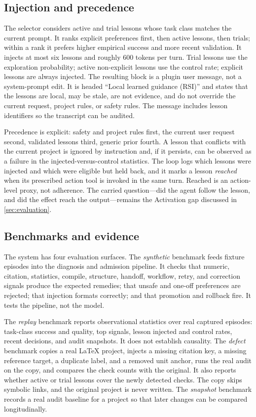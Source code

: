 \subsection{Injection and precedence}
\label{sec:injection}
The selector considers active and trial lessons whose task class matches the current prompt. It ranks explicit preferences first, then active lessons, then trials; within a rank it prefers higher empirical success and more recent validation. It injects at most six lessons and roughly 600 tokens per turn. Trial lessons use the exploration probability; active non-explicit lessons use the control rate; explicit lessons are always injected. The resulting block is a plugin user message, not a system-prompt edit. It is headed ``Local learned guidance (RSI)'' and states that the lessons are local, may be stale, are not evidence, and do not override the current request, project rules, or safety rules. The message includes lesson identifiers so the transcript can be audited.

Precedence is explicit: safety and project rules first, the current user request second, validated lessons third, generic prior fourth. A lesson that conflicts with the current project is ignored by instruction and, if it persists, can be observed as a failure in the injected-versus-control statistics. The loop logs which lessons were injected and which were eligible but held back, and it marks a lesson \emph{reached} when its prescribed action tool is invoked in the same turn. Reached is an action-level proxy, not adherence. The carried question---did the agent follow the lesson, and did the effect reach the output---remains the Activation gap discussed in \cref{sec:evaluation}.

\subsection{Benchmarks and evidence}
\label{sec:benchmarks}
The system has four evaluation surfaces. The \emph{synthetic} benchmark feeds fixture episodes into the diagnosis and admission pipeline. It checks that numeric, citation, statistics, compile, structure, handoff, workflow, retry, and correction signals produce the expected remedies; that unsafe and one-off preferences are rejected; that injection formats correctly; and that promotion and rollback fire. It tests the pipeline, not the model.

The \emph{replay} benchmark reports observational statistics over real captured episodes: task-class success and quality, top signals, lesson injected and control rates, recent decisions, and audit snapshots. It does not establish causality. The \emph{defect} benchmark copies a real \LaTeX{} project, injects a missing citation key, a missing reference target, a duplicate label, and a removed unit anchor, runs the real \ah{} audit on the copy, and compares the check counts with the original. It also reports whether active or trial lessons cover the newly detected checks. The copy skips symbolic links, and the original project is never written. The \emph{snapshot} benchmark records a real audit baseline for a project so that later changes can be compared longitudinally.

